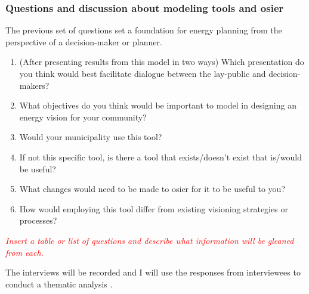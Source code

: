 \subsubsection{Questions and discussion about modeling tools and \ac{osier}} The
previous set of questions set a foundation for energy planning from the
perspective of a decision-maker or planner. 

\begin{enumerate}
    \item (After presenting results from this model in two ways) Which
    presentation do you think would best facilitate dialogue between the
    lay-public and decision-makers?
    \item What objectives do you think would be important to model in designing
    an energy vision for your community?
    \item Would your municipality use this tool? 
    \item If not this specific tool, is there a tool that exists/doesn't exist
    that is/would be useful?
    \item What changes would need to be made to \ac{osier} for it to be useful
    to you?
    \item How would employing this tool differ from existing visioning
    strategies or processes?
\end{enumerate}

\textit{\textcolor{red}{Insert a table or list of questions and describe what
information will be gleaned from each.}}

The interviews will be recorded and I will use the responses from interviewees
to conduct a thematic analysis
\cite{braun_toward_2023,maguire_doing_2017,scharp_what_2019}.


